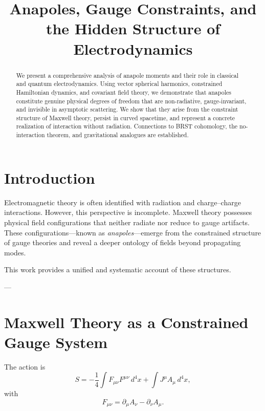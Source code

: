 \documentclass[11pt]{article}
\title{\textbf{Anapoles, Gauge Constraints, and the Hidden Structure of Electrodynamics}}
\author{ }
\date{}
\begin{document}
\maketitle

\begin{abstract}
We present a comprehensive analysis of anapole moments and their role in classical and quantum electrodynamics. 
Using vector spherical harmonics, constrained Hamiltonian dynamics, and covariant field theory, we demonstrate that anapoles constitute genuine physical degrees of freedom that are non-radiative, gauge-invariant, and invisible in asymptotic scattering. 
We show that they arise from the constraint structure of Maxwell theory, persist in curved spacetime, and represent a concrete realization of interaction without radiation. 
Connections to BRST cohomology, the no-interaction theorem, and gravitational analogues are established.
\end{abstract}

\tableofcontents

\newpage

\section{Introduction}

Electromagnetic theory is often identified with radiation and charge–charge interactions.  
However, this perspective is incomplete.  
Maxwell theory possesses physical field configurations that neither radiate nor reduce to gauge artifacts.  
These configurations—known as \emph{anapoles}—emerge from the constrained structure of gauge theories and reveal a deeper ontology of fields beyond propagating modes.

This work provides a unified and systematic account of these structures.

---

\section{Maxwell Theory as a Constrained Gauge System}

The action is
\begin{equation}
S = -\frac14 \int F_{\mu\nu}F^{\mu\nu}\, d^4x + \int J^\mu A_\mu \, d^4x,
\end{equation}
with
\begin{equation}
F_{\mu\nu} = \partial_\mu A_\nu - \partial_\nu A_\mu .
\end{equation}
\end{document}

